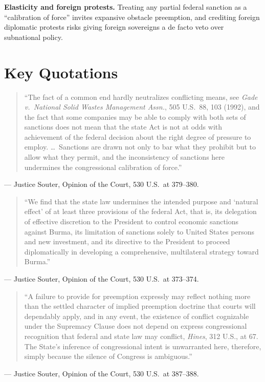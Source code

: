 \documentclass[12pt]{article}
\begin{document}
\textbf{Elasticity and foreign protests.} Treating any partial federal sanction as a ``calibration of force'' invites expansive obstacle preemption, and crediting foreign diplomatic protests risks giving foreign sovereigns a de facto veto over subnational policy.

\section{Key Quotations}

\begin{quote}
``The fact of a common end hardly neutralizes conflicting means, see \textit{Gade v.\ National Solid Wastes Management Assn.}, 505 U.S.\ 88, 103 (1992), and the fact that some companies may be able to comply with both sets of sanctions does not mean that the state Act is not at odds with achievement of the federal decision about the right degree of pressure to employ. \dots\ Sanctions are drawn not only to bar what they prohibit but to allow what they permit, and the inconsistency of sanctions here undermines the congressional calibration of force.''
\end{quote}
\noindent --- Justice Souter, Opinion of the Court, 530 U.S.\ at 379--380.

\begin{quote}
``We find that the state law undermines the intended purpose and `natural effect' of at least three provisions of the federal Act, that is, its delegation of effective discretion to the President to control economic sanctions against Burma, its limitation of sanctions solely to United States persons and new investment, and its directive to the President to proceed diplomatically in developing a comprehensive, multilateral strategy toward Burma.''
\end{quote}
\noindent --- Justice Souter, Opinion of the Court, 530 U.S.\ at 373--374.

\begin{quote}
``A failure to provide for preemption expressly may reflect nothing more than the settled character of implied preemption doctrine that courts will dependably apply, and in any event, the existence of conflict cognizable under the Supremacy Clause does not depend on express congressional recognition that federal and state law may conflict, \textit{Hines}, 312 U.S., at 67. The State's inference of congressional intent is unwarranted here, therefore, simply because the silence of Congress is ambiguous.''
\end{quote}
\noindent --- Justice Souter, Opinion of the Court, 530 U.S.\ at 387--388.
\end{document}
